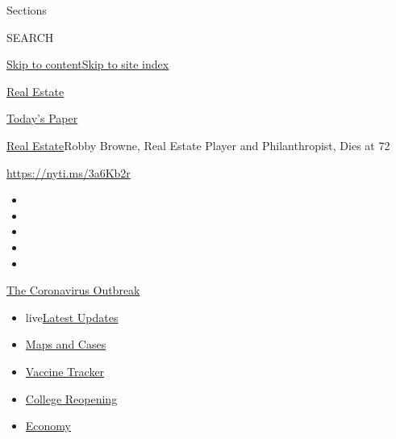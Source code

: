Sections

SEARCH

\protect\hyperlink{site-content}{Skip to
content}\protect\hyperlink{site-index}{Skip to site index}

\href{https://www.nytimes3xbfgragh.onion/section/realestate}{Real
Estate}

\href{https://myaccount.nytimes3xbfgragh.onion/auth/login?response_type=cookie\&client_id=vi}{}

\href{https://www.nytimes3xbfgragh.onion/section/todayspaper}{Today's
Paper}

\href{/section/realestate}{Real Estate}\textbar{}Robby Browne, Real
Estate Player and Philanthropist, Dies at 72

\url{https://nyti.ms/3a6Kb2r}

\begin{itemize}
\item
\item
\item
\item
\item
\end{itemize}

\href{https://www.nytimes3xbfgragh.onion/news-event/coronavirus?action=click\&pgtype=Article\&state=default\&region=TOP_BANNER\&context=storylines_menu}{The
Coronavirus Outbreak}

\begin{itemize}
\tightlist
\item
  live\href{https://www.nytimes3xbfgragh.onion/2020/08/04/world/coronavirus-covid-19.html?action=click\&pgtype=Article\&state=default\&region=TOP_BANNER\&context=storylines_menu}{Latest
  Updates}
\item
  \href{https://www.nytimes3xbfgragh.onion/interactive/2020/us/coronavirus-us-cases.html?action=click\&pgtype=Article\&state=default\&region=TOP_BANNER\&context=storylines_menu}{Maps
  and Cases}
\item
  \href{https://www.nytimes3xbfgragh.onion/interactive/2020/science/coronavirus-vaccine-tracker.html?action=click\&pgtype=Article\&state=default\&region=TOP_BANNER\&context=storylines_menu}{Vaccine
  Tracker}
\item
  \href{https://www.nytimes3xbfgragh.onion/2020/08/02/us/covid-college-reopening.html?action=click\&pgtype=Article\&state=default\&region=TOP_BANNER\&context=storylines_menu}{College
  Reopening}
\item
  \href{https://www.nytimes3xbfgragh.onion/live/2020/08/03/business/stock-market-today-coronavirus?action=click\&pgtype=Article\&state=default\&region=TOP_BANNER\&context=storylines_menu}{Economy}
\end{itemize}

